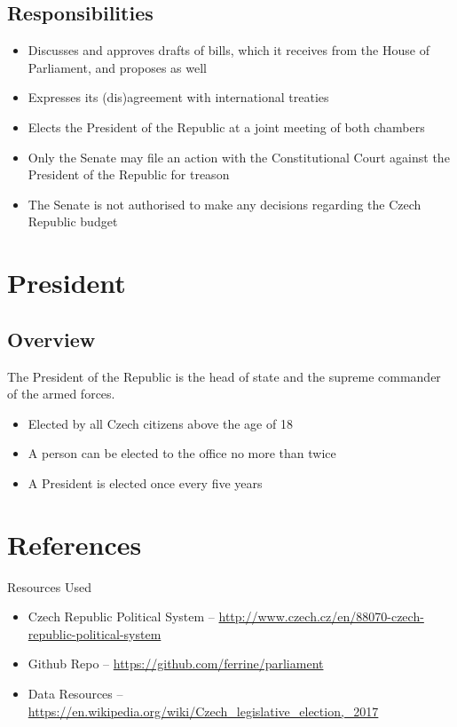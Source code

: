 \documentclass{beamer}
\begin{document}
\subsection{Responsibilities}
\begin{frame}
	\begin{itemize}
		\item Discusses and approves drafts of bills, which it receives from the House of Parliament, and proposes as well
		\item Expresses its (dis)agreement with international treaties
		\item Elects the President of the Republic at a joint meeting of both chambers
		\item Only the Senate may file an action with the Constitutional Court against the President of the Republic for treason
		\item The Senate is not authorised to make any decisions regarding the Czech Republic budget
	\end{itemize}
\end{frame}
\section{President}
\subsection{Overview}
\begin{frame}
	The President of the Republic is the head of state and the supreme commander of the armed forces.
	\begin{itemize}
		\item Elected by all Czech citizens above the age of 18
		\item A person can be elected to the office no more than twice
		\item A President is elected once every five years
	\end{itemize}
\end{frame}
\section{References}
\begin{frame}[t]
	Resources Used
	\begin{itemize}
		 \item Czech Republic Political System -- \href{http://www.czech.cz/en/88070-czech-republic-political-system}{http://www.czech.cz/en/88070-czech-republic-political-system}
		 \item Github Repo -- \href{https://github.com/ferrine/parliament}{https://github.com/ferrine/parliament}
		 \item Data Resources -- \href{https://en.wikipedia.org/wiki/Czech_legislative_election,_2017}{https://en.wikipedia.org/wiki/Czech\_legislative\_election,\_2017}
	\end{itemize}

\end{frame}
\end{document}
